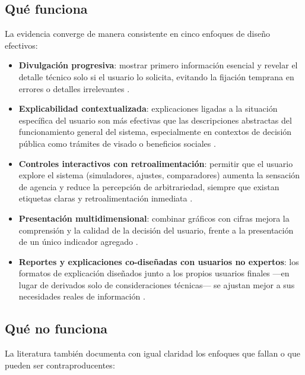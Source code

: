 \subsection{Qué funciona}\label{sec:que-funciona}

La evidencia converge de manera consistente en cinco enfoques de diseño efectivos:

\begin{itemize}
    \item \textbf{Divulgación progresiva}: mostrar primero información esencial y revelar el detalle técnico solo si el usuario lo solicita, evitando la fijación temprana en errores o detalles irrelevantes \citep{springerwhittaker2019,springerwhittaker2020}.
    \item \textbf{Explicabilidad contextualizada}: explicaciones ligadas a la situación específica del usuario son más efectivas que las descripciones abstractas del funcionamiento general del sistema, especialmente en contextos de decisión pública como trámites de visado o beneficios sociales \citep{nefedov2022}.
    \item \textbf{Controles interactivos con retroalimentación}: permitir que el usuario explore el sistema (simuladores, ajustes, comparadores) aumenta la sensación de agencia y reduce la percepción de arbitrariedad, siempre que existan etiquetas claras y retroalimentación inmediata \citep{kim2021recommender,feddersen2024forecasting}.
    \item \textbf{Presentación multidimensional}: combinar gráficos con cifras mejora la comprensión y la calidad de la decisión del usuario, frente a la presentación de un único indicador agregado \citep{glazerman2018multidim}.
    \item \textbf{Reportes y explicaciones co-diseñadas con usuarios no expertos}: los formatos de explicación diseñados junto a los propios usuarios finales —en lugar de derivados solo de consideraciones técnicas— se ajustan mejor a sus necesidades reales de información \citep{peng2023codesign,bobek2024xai}.
\end{itemize}

\subsection{Qué no funciona}

La literatura también documenta con igual claridad los enfoques que fallan o que pueden ser contraproducentes:

